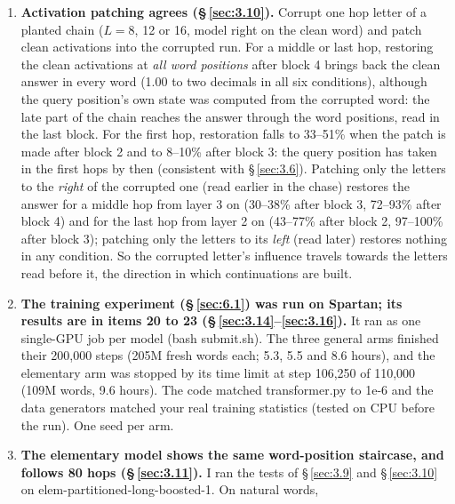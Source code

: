 \documentclass[paper=a4,fontsize=11pt,DIV=11,parskip=half,headings=small,numbers=noendperiod]{scrartcl}
\DeclareRobustCommand{\lead}[1]{\textsf{\bfseries\color{accent}#1}}
\DeclareRobustCommand{\code}[1]{{\fontseries{m}\ttfamily #1}}
\begin{document}
\begin{enumerate}
  five blocks near 16 hops. A probe does not show the algorithm, and the high-$h$ bins come from my planted
  words only (\S\,\ref{sec:3.9}). The elementary model shows the same staircase at its word positions and still
  follows 80 hops (item 18). A five-block model trained on long chains does 24 hops (item 20), and its probes do
  not follow this staircase (item 22).
\item \lead{Activation patching agrees (\S\,\ref{sec:3.10}).} Corrupt one hop letter of a planted chain ($L=8$,
  12 or 16, model right on the clean word) and patch clean activations into the corrupted run. For a middle or
  last hop, restoring the clean activations at \emph{all word positions} after block 4 brings back the clean
  answer in every word (1.00 to two decimals in all six conditions), although the query position’s own state was
  computed from the corrupted word: the late part of the chain reaches the answer through the word positions,
  read in the last block. For the first hop, restoration falls to 33–51\% when the patch is made after block 2
  and to 8–10\% after block 3: the query position has taken in the first hops by then (consistent with
  \S\,\ref{sec:3.6}). Patching only the letters to the \emph{right} of the corrupted one (read earlier in the
  chase) restores the answer for a middle hop from layer 3 on (30–38\% after block 3, 72–93\% after block 4) and
  for the last hop from layer 2 on (43–77\% after block 2, 97–100\% after block 3); patching only the letters to
  its \emph{left} (read later) restores nothing in any condition. So the corrupted letter’s influence travels
  towards the letters read before it, the direction in which continuations are built.
\item \lead{The training experiment (\S\,\ref{sec:6.1}) was run on Spartan; its results are in items 20 to 23
  (\S\,\ref{sec:3.14}–\ref{sec:3.16}).} It ran as one single-GPU job per model (\code{bash
  submit.\allowbreak{}sh}). The three general arms finished their 200,000 steps (205M fresh words each; 5.3, 5.5
  and 8.6 hours), and the elementary arm was stopped by its time limit at step 106,250 of 110,000 (109M words,
  9.6 hours). The code matched \code{transformer.\allowbreak{}py} to 1e-6 and the data generators matched your
  real training statistics (tested on CPU before the run). One seed per arm.
\item \lead{The elementary model shows the same word-position staircase, and follows 80 hops
  (\S\,\ref{sec:3.11}).} I ran the tests of \S\,\ref{sec:3.9} and \S\,\ref{sec:3.10} on
  \code{elem-\allowbreak{}partitioned-\allowbreak{}long-\allowbreak{}boosted-\allowbreak{}1}. On natural words,

\end{enumerate}
\end{document}
